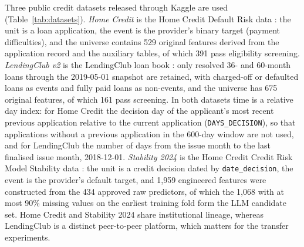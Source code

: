 \documentclass[final,5p,twocolumn]{elsarticle}
\begin{document}
Three public credit datasets released through Kaggle are used (Table~\ref{tab:datasets}). \emph{Home Credit} is the Home Credit Default Risk data \cite{homecredit2018}: the unit is a loan application, the event is the provider's binary target (payment difficulties), and the universe contains 529 original features derived from the application record and the auxiliary tables, of which 391 pass eligibility screening. \emph{LendingClub v2} is the LendingClub loan book \cite{lendingclub_kaggle}: only resolved 36- and 60-month loans through the 2019-05-01 snapshot are retained, with charged-off or defaulted loans as events and fully paid loans as non-events, and the universe has 675 original features, of which 161 pass screening. In both datasets time is a relative day index: for Home Credit the decision day of the applicant's most recent previous application relative to the current application (\texttt{DAYS\_DECISION}), so that applications without a previous application in the 600-day window are not used, and for LendingClub the number of days from the issue month to the last finalised issue month, 2018-12-01. \emph{Stability 2024} is the Home Credit Credit Risk Model Stability data \cite{homecredit2024}: the unit is a credit decision dated by \texttt{date\_decision}, the event is the provider's default target, and 1,959 engineered features were constructed from the 434 approved raw predictors, of which the 1,068 with at most 90\% missing values on the earliest training fold form the LLM candidate set. Home Credit and Stability 2024 share institutional lineage, whereas LendingClub is a distinct peer-to-peer platform, which matters for the transfer experiments.
\end{document}
